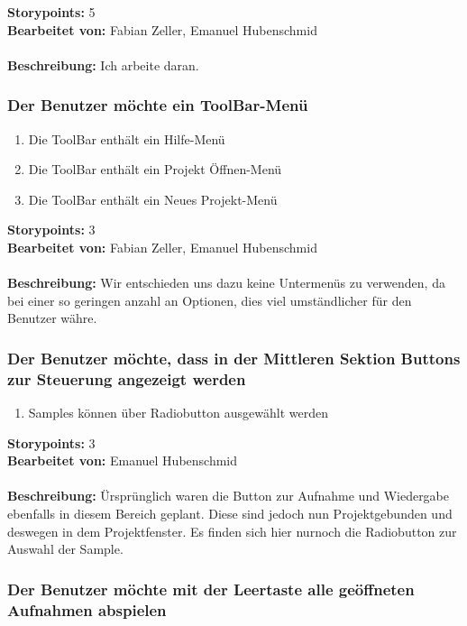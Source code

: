 \textbf{Storypoints:} 5 \\
\textbf{Bearbeitet von:} Fabian Zeller, Emanuel Hubenschmid \\
\\
\textbf{Beschreibung:} Ich arbeite daran.


\subsubsection{Der Benutzer möchte ein ToolBar-Menü}

\begin{enumerate}
 \item Die ToolBar enthält ein Hilfe-Menü
 \item Die ToolBar enthält ein Projekt Öffnen-Menü
 \item Die ToolBar enthält ein Neues Projekt-Menü
\end{enumerate}

\textbf{Storypoints:} 3 \\
\textbf{Bearbeitet von:} Fabian Zeller, Emanuel Hubenschmid \\
\\
\textbf{Beschreibung:} Wir entschieden uns dazu keine Untermenüs zu verwenden, da bei einer so 
geringen anzahl an Optionen, dies viel umständlicher für den Benutzer währe.


\subsubsection{Der Benutzer möchte, dass in der Mittleren Sektion Buttons zur Steuerung angezeigt 
werden}

\begin{enumerate}
 \item Samples können über Radiobutton ausgewählt werden
\end{enumerate}

\textbf{Storypoints:} 3 \\
\textbf{Bearbeitet von:} Emanuel Hubenschmid \\
\\
\textbf{Beschreibung:} Ürsprünglich waren die Button zur Aufnahme und Wiedergabe ebenfalls in 
diesem Bereich geplant. Diese sind jedoch nun Projektgebunden und deswegen in dem Projektfenster. 
Es finden sich hier nurnoch die Radiobutton zur Auswahl der Sample.


\subsubsection{Der Benutzer möchte mit der Leertaste alle geöffneten Aufnahmen abspielen}

